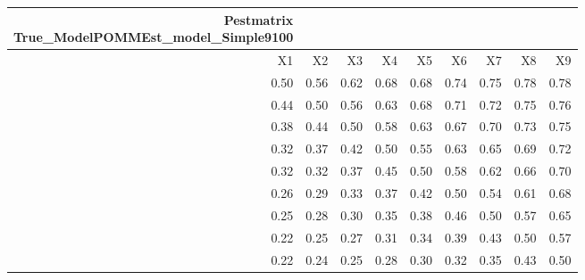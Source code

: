 \begin{longtable}{rrrrrrrrr}
\caption*{
{\large Pestmatrix} \\ 
{\small True\_ModelPOMMEst\_model\_Simple9100}
} \\ 
\toprule
X1 & X2 & X3 & X4 & X5 & X6 & X7 & X8 & X9 \\ 
\midrule
0.50 & 0.56 & 0.62 & 0.68 & 0.68 & 0.74 & 0.75 & 0.78 & 0.78 \\ 
0.44 & 0.50 & 0.56 & 0.63 & 0.68 & 0.71 & 0.72 & 0.75 & 0.76 \\ 
0.38 & 0.44 & 0.50 & 0.58 & 0.63 & 0.67 & 0.70 & 0.73 & 0.75 \\ 
0.32 & 0.37 & 0.42 & 0.50 & 0.55 & 0.63 & 0.65 & 0.69 & 0.72 \\ 
0.32 & 0.32 & 0.37 & 0.45 & 0.50 & 0.58 & 0.62 & 0.66 & 0.70 \\ 
0.26 & 0.29 & 0.33 & 0.37 & 0.42 & 0.50 & 0.54 & 0.61 & 0.68 \\ 
0.25 & 0.28 & 0.30 & 0.35 & 0.38 & 0.46 & 0.50 & 0.57 & 0.65 \\ 
0.22 & 0.25 & 0.27 & 0.31 & 0.34 & 0.39 & 0.43 & 0.50 & 0.57 \\ 
0.22 & 0.24 & 0.25 & 0.28 & 0.30 & 0.32 & 0.35 & 0.43 & 0.50 \\ 
\bottomrule
\end{longtable}

